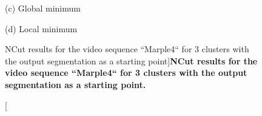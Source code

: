 \begin{figure}[htbp]
\begin{minipage}[t]{0.5\linewidth}
\begin{minipage}[t]{1\textwidth}
\footnotesize (c) Global minimum
\end{minipage}
\begin{minipage}[t]{1\textwidth}
\centering
\hfill \hfill   \hfill 
{} 
\hfill 
{} 
\hfill 
{} 
\hfill 
{} 

\footnotesize (d) Local minimum
\end{minipage}

\end{minipage}
\caption[NCut results for the video sequence ``Marple4`` for 3 clusters with the output segmentation as a starting point]{
{\bf NCut results for the video sequence ``Marple4`` for 3 clusters with the output segmentation as a starting point.}}
\label{fig:NCut_3}
\end{figure}

